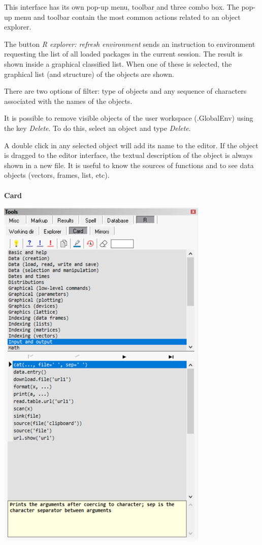 This interface has its own pop-up menu, toolbar and three combo box.
The pop-up menu and toolbar contain the most common actions related to an object explorer.

The button \textit{R explorer: refresh environment} sends an instruction to
\RR{} environment requesting the list of all loaded packages in the current
session. The result is shown inside a graphical classified list. When one
of these is selected, the graphical list (and structure) of the objects
are shown.

There are two options of filter: type of objects and any sequence of
characters associated with the names of the objects.

It is possible to remove visible objects of the user workspace (.GlobalEnv)
using the key \textit{Delete}. To do this, select an object and type
\textit{Delete}.

A double click in any selected object will add its name to the editor.
If the object is dragged to the editor interface, the textual description
of the object is always shown in a new file. It is useful to know the
sources of functions and to see data objects (vectors, frames, list, etc).

\newpage
\paragraph{}\textbf{Card}\\

\includegraphics[scale=0.50]{./res/tools_r_card.png} \\

